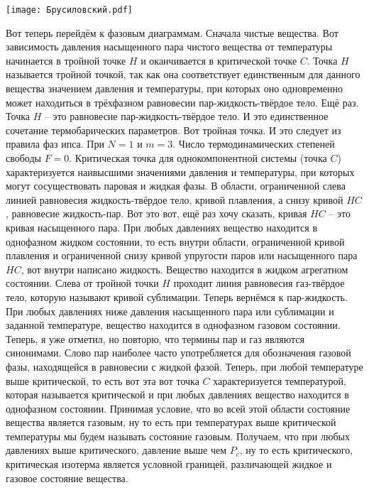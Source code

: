 \documentclass[main.tex]{subfiles}
\begin{document}
\begin{center}
\texttt{[image: Брусиловский.pdf]}
\end{center}

Вот теперь перейдём к фазовым диаграммам.
Сначала чистые вещества.
Вот зависимость давления насыщенного пара чистого вещества от температуры начинается в тройной точке $H$ и оканчивается в критической точке $C$.
Точка $H$ называется тройной точкой, так как она соответствует единственным для данного вещества значением давления и температуры, при которых оно одновременно может находиться в трёхфазном равновесии пар-жидкость-твёрдое тело.
Ещё раз.
Точка $H$ -- это равновесие пар-жидкость-твёрдое тело.
И это единственное сочетание термобарических параметров.
Вот тройная точка.
И это следует из правила фаз ипса.
При $N=1$ и $m=3$.
Число термодинамических степеней свободы $F=0$.
Критическая точка для однокомпонентной системы (точка $C$) характеризуется наивысшими значениями давления и температуры, при которых могут сосуществовать паровая и жидкая фазы.
В области, ограниченной слева линией равновесия жидкость-твёрдое тело, кривой плавления, а снизу кривой $HC$, равновесие жидкость-пар.
Вот это вот, ещё раз хочу сказать, кривая $HC$ -- это кривая насыщенного пара.
При любых давлениях вещество находится в однофазном жидком состоянии, то есть внутри области, ограниченной кривой плавления и ограниченной снизу кривой упругости паров или насыщенного пара $HC$, вот внутри написано жидкость.
Вещество находится в жидком агрегатном состоянии.
Слева от тройной точки $H$ проходит линия равновесия газ-твёрдое тело, которую называют кривой сублимации.
Теперь вернёмся к пар-жидкость.
При любых давлениях ниже давления насыщенного пара или сублимации и заданной температуре, вещество находится в однофазном газовом состоянии.
Теперь, я уже отметил, но повторю, что термины пар и газ являются синонимами.
Слово пар наиболее часто употребляется для обозначения газовой фазы, находящейся в равновесии с жидкой фазой.
Теперь, при любой температуре выше критической, то есть вот эта вот точка $C$ характеризуется температурой, которая называется критической и при любых давлениях вещество находится в однофазном состоянии.
Принимая условие, что во всей этой области состояние вещества является газовым, ну то есть при температурах выше критической температуры мы будем называть состояние газовым.
Получаем, что при любых давлениях выше критического, давление выше чем $P_c$, ну то есть критического, критическая изотерма является условной границей, различающей жидкое и газовое состояние вещества.
\end{document}
